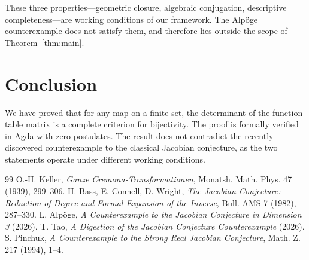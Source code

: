 \documentclass[a4paper,11pt]{article}
\theoremstyle{definition}
\theoremstyle{remark}
\begin{document}
These three properties---geometric closure, algebraic conjugation,
descriptive completeness---are working conditions of our framework.
The Alp\"{o}ge counterexample does not satisfy them, and therefore
lies outside the scope of Theorem~\ref{thm:main}.

\section{Conclusion}

We have proved that for any map on a finite set, the determinant of the
function table matrix is a complete criterion for bijectivity. The proof
is formally verified in Agda with zero postulates. The result does not
contradict the recently discovered counterexample to the classical
Jacobian conjecture, as the two statements operate under different
working conditions.

\begin{thebibliography}{99}
 O.-H. Keller, \textit{Ganze Cremona-Transformationen}, Monatsh. Math. Phys. 47 (1939), 299--306.
 H. Bass, E. Connell, D. Wright, \textit{The Jacobian Conjecture: Reduction of Degree and Formal Expansion of the Inverse}, Bull. AMS 7 (1982), 287--330.
 L. Alp\"{o}ge, \textit{A Counterexample to the Jacobian Conjecture in Dimension 3} (2026).
 T. Tao, \textit{A Digestion of the Jacobian Conjecture Counterexample} (2026).
 S. Pinchuk, \textit{A Counterexample to the Strong Real Jacobian Conjecture}, Math. Z. 217 (1994), 1--4.
\end{thebibliography}
\end{document}
